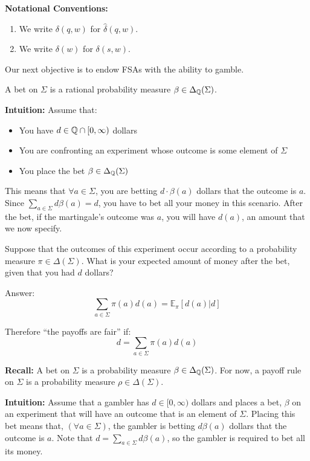 \documentclass[../main.tex]{subfiles}
\begin{document}
\textbf{Notational Conventions:}
\begin{enumerate}
    \item We write $\delta(q, w)$ for $\hat{\delta}(q, w)$.
    \item We write $\delta(w)$ for $\delta(s, w)$.
\end{enumerate}

Our next objective is to endow FSAs with the ability to gamble.

\begin{defn}
    A bet on $\Sigma$ is a rational probability measure $\beta \in \Delta_{\mathbb{Q}}(\Sigma)$.
\end{defn}

\textbf{Intuition:}
Assume that:
\begin{itemize}
    \item You have $d \in \mathbb{Q} \cap [0, \infty)$ dollars
    \item You are confronting an experiment whose outcome is some element of $\Sigma$
    \item You place the bet $\beta \in \Delta_{\mathbb{Q}}(\Sigma)$
\end{itemize}

This means that $\forall a \in \Sigma$, you are betting $d\cdot\beta(a)$ dollars
that the outcome is $a$. Since $\sum_{a \in \Sigma} d\beta(a) = d$, you have to
bet all your money in this scenario. After the bet, if the martingale's outcome
was $a$, you will have $d(a)$, an amount that we now specify.

Suppose that the outcomes of this experiment occur according to a probability
measure $\pi \in \Delta(\Sigma)$. What is your expected amount of money after
the bet, given that you had $d$ dollars?

Answer:
\begin{equation*}
    \sum_{a \in \Sigma} \pi(a)d(a) = \mathbb{E}_{\pi}[d(a) | d]
\end{equation*}

Therefore ``the payoffs are fair'' if:
\begin{equation*}
    d = \sum_{a \in \Sigma} \pi(a)d(a)
\end{equation*}

\textbf{Recall:}
A bet on $\Sigma$ is a probability measure $\beta \in \Delta_{\mathbb{Q}}(\Sigma)$.
For now, a payoff rule on $\Sigma$ is a probability measure $\rho \in \Delta(\Sigma)$.

\textbf{Intuition:}
    Assume that a gambler has $d \in [0, \infty)$ dollars and places a bet,
$\beta$ on an experiment that will have an outcome that is an element of $\Sigma$.
Placing this bet means that, $(\forall a \in \Sigma)$, the gambler is betting
$d\beta(a)$ dollars that the outcome is $a$. Note that $d = \sum_{a \in \Sigma} d\beta(a)$,
so the gambler is required to bet all its money.
\end{document}
